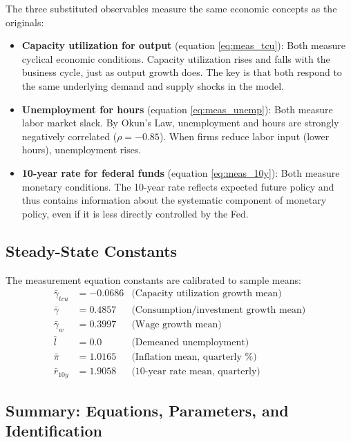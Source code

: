 \documentclass[12pt]{article}
\begin{document}
The three substituted observables measure the same economic concepts as the originals:

\begin{itemize}
    \item \textbf{Capacity utilization for output} (equation \ref{eq:meas_tcu}): Both measure cyclical economic conditions. Capacity utilization rises and falls with the business cycle, just as output growth does. The key is that both respond to the same underlying demand and supply shocks in the model.
    
    \item \textbf{Unemployment for hours} (equation \ref{eq:meas_unemp}): Both measure labor market slack. By Okun's Law, unemployment and hours are strongly negatively correlated ($\rho = -0.85$). When firms reduce labor input (lower hours), unemployment rises.
    
    \item \textbf{10-year rate for federal funds} (equation \ref{eq:meas_10y}): Both measure monetary conditions. The 10-year rate reflects expected future policy and thus contains information about the systematic component of monetary policy, even if it is less directly controlled by the Fed.
\end{itemize}

\subsection{Steady-State Constants}

The measurement equation constants are calibrated to sample means:
\begin{align*}
\bar{\gamma}_{tcu} &= -0.0686 & \text{(Capacity utilization growth mean)} \\
\bar{\gamma} &= 0.4857 & \text{(Consumption/investment growth mean)} \\
\bar{\gamma}_w &= 0.3997 & \text{(Wage growth mean)} \\
\bar{l} &= 0.0 & \text{(Demeaned unemployment)} \\
\bar{\pi} &= 1.0165 & \text{(Inflation mean, quarterly \%)} \\
\bar{r}_{10y} &= 1.9058 & \text{(10-year rate mean, quarterly)}
\end{align*}

\subsection{Summary: Equations, Parameters, and Identification}
\end{document}
